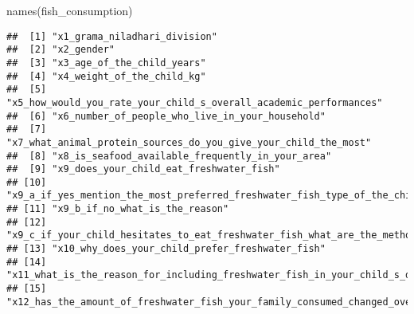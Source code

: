 \documentclass[
]{article}
\newenvironment{Shaded}{\begin{snugshade}}{\end{snugshade}}
\newcommand{\FunctionTok}[1]{\textcolor[rgb]{0.00,0.00,0.00}{#1}}
\newcommand{\NormalTok}[1]{#1}
\begin{document}
\begin{Shaded}
\begin{Highlighting}[]
\FunctionTok{names}\NormalTok{(fish\_consumption)}
\end{Highlighting}
\end{Shaded}

\begin{verbatim}
##  [1] "x1_grama_niladhari_division"                                                                                                                 
##  [2] "x2_gender"                                                                                                                                   
##  [3] "x3_age_of_the_child_years"                                                                                                                   
##  [4] "x4_weight_of_the_child_kg"                                                                                                                   
##  [5] "x5_how_would_you_rate_your_child_s_overall_academic_performances"                                                                            
##  [6] "x6_number_of_people_who_live_in_your_household"                                                                                              
##  [7] "x7_what_animal_protein_sources_do_you_give_your_child_the_most"                                                                              
##  [8] "x8_is_seafood_available_frequently_in_your_area"                                                                                             
##  [9] "x9_does_your_child_eat_freshwater_fish"                                                                                                      
## [10] "x9_a_if_yes_mention_the_most_preferred_freshwater_fish_type_of_the_child"                                                                    
## [11] "x9_b_if_no_what_is_the_reason"                                                                                                               
## [12] "x9_c_if_your_child_hesitates_to_eat_freshwater_fish_what_are_the_methods_you_used_to_encourage_improve_their_consumption_usually"            
## [13] "x10_why_does_your_child_prefer_freshwater_fish"                                                                                              
## [14] "x11_what_is_the_reason_for_including_freshwater_fish_in_your_child_s_diet"                                                                   
## [15] "x12_has_the_amount_of_freshwater_fish_your_family_consumed_changed_over_the_last_3_years"                                                    

\end{verbatim}
\end{document}
